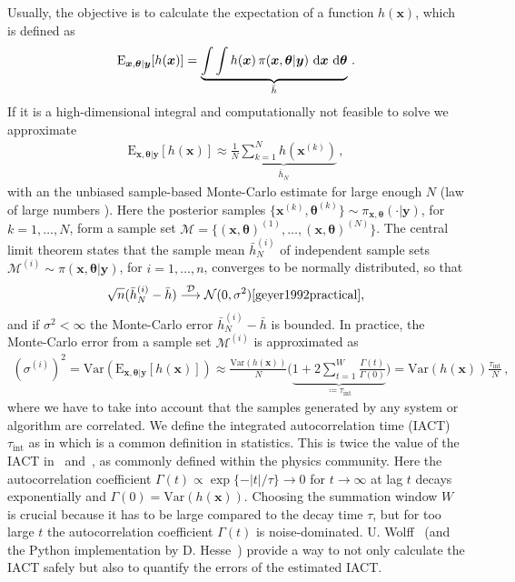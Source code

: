 Usually, the objective is to calculate the expectation of a function $h(\bm{x})$, which is defined as
\begin{align}
	\text{E}_{\bm{x},\bm{\theta}|\bm{y}} [h(\bm{x})] =  \underbrace{\int \int   h(\bm{x}) \,  \pi(\bm{x}, \bm{\theta} | \bm{y} ) \, \mathop{}\!\mathrm{d} \bm{x}  \, \mathop{}\!\mathrm{d} \bm{\theta}}_{\bar{h}}   \label{eq:expPos} \, .
\end{align}
If it is a high-dimensional integral and computationally not feasible to solve we approximate 
\begin{align}
	\label{eq:sampMean}
	\text{E}_{\bm{x},\bm{\theta}|\bm{y}} [h(\bm{x})] \approx \underbrace{ \frac{1}{N} \sum_{k=1}^{N} h(\bm{x}^{(k)})  }_{\bar{h}_N} \, ,
\end{align}
with an the unbiased sample-based Monte-Carlo estimate \cite{roberts2004general} for large enough $N$ (law of large numbers \cite[Chapter 17]{tweedie2009measprob}).
Here the posterior samples $\{\bm{x}^{(k)},\bm{\theta}^{(k)} \}\sim \pi_{\bm{x}, \bm{\theta}}(\cdot|\bm{y})$, for $k = 1, \dots, N$, form a sample set $\mathcal{M} =\{ (\bm{x},\bm{\theta})^{(1)}, \dots ,  (\bm{x},\bm{\theta})^{(N)} \}$.
The central limit theorem states that the sample mean $\bar{h}^{(i)}_N $ of independent sample sets $\mathcal{M}^{(i)}\sim\pi (\bm{x}, \bm{\theta}| \bm{y})$, for $i = 1, \dots, n$, converges to be normally distributed, so that
\begin{align}
	\sqrt{n} (\bar{h}^{(i)}_N -  \bar{h} ) \overset{\mathcal{D}}{\longrightarrow} \mathcal{N} (0,\sigma^2) \text{\cite{geyer1992practical}},
\end{align}
and if $\sigma^2 < \infty$ the Monte-Carlo error $\bar{h}^{(i)}_N -  \bar{h} $ is bounded.
In practice, the Monte-Carlo error from a sample set $\mathcal{M}^{(i)}$ is approximated as
\begin{align}
	(\sigma^{(i)})^2  =  \text{Var}(\text{E}_{\bm{x},\bm{\theta}|\bm{y}} [h(\bm{x})]) 
	\approx \frac{\text{Var}(h(\bm{x}) )}{N} \Bigg( \underbrace{  1 + 2 \sum_{t = 1}^{W} \frac{\Gamma(t)}{\Gamma(0)}  }_{ \coloneqq 	\tau_{\text{int}} }\Bigg) = \text{Var}(h(\bm{x})) \frac{ \tau_{\text{int}} }{N} \, , \label{eq:MCerr}
\end{align}
where we have to take into account that the samples generated by any system or algorithm are correlated.
We define the integrated autocorrelation time (IACT) $\tau_{\text{int}}$ as in \cite{fox2016fast} which is a common definition in statistics.
This is twice the value of the IACT in~\cite[pp. 103-105]{wolff2002LecNot} and~\cite{wolff2004monte,drikHesse}, as commonly defined within the physics community.
Here the autocorrelation coefficient $\Gamma(t) \propto \exp\{ - |t| /\tau \} \longrightarrow 0$ for $t \rightarrow \infty$ at lag $t$ decays exponentially and $\Gamma(0) =\text{Var}(h(\bm{x}) ) $.
Choosing the summation window $W$ is crucial because it has to be large compared to the decay time $\tau$, but for too large $t$ the autocorrelation coefficient $\Gamma(t)$ is noise-dominated.
U. Wolff~\cite{wolff2004monte} (and the Python implementation by D. Hesse~\cite{drikHesse}) provide a way to not only calculate the IACT safely but also to quantify the errors of the estimated IACT.

